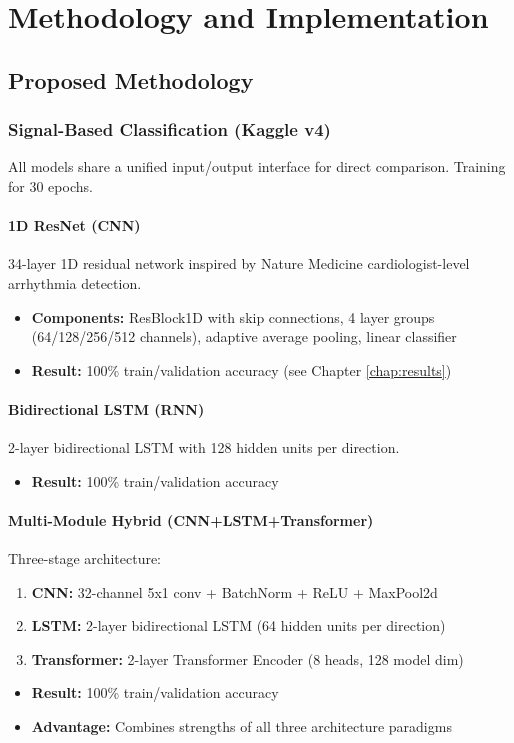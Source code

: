 \part{Methodology and Implementation}

\chapter{Proposed Methodology}
\label{chap:methodology}

\section{Signal-Based Classification (Kaggle v4)}
All models share a unified input/output interface for direct comparison. Training for 30 epochs.

\subsection{1D ResNet (CNN)}
34-layer 1D residual network inspired by Nature Medicine cardiologist-level arrhythmia detection.
\begin{itemize}
    \item \textbf{Components:} ResBlock1D with skip connections, 4 layer groups (64/128/256/512 channels), adaptive average pooling, linear classifier
    \item \textbf{Result:} 100\% train/validation accuracy (see Chapter \ref{chap:results})
\end{itemize}

\subsection{Bidirectional LSTM (RNN)}
2-layer bidirectional LSTM with 128 hidden units per direction.
\begin{itemize}
    \item \textbf{Result:} 100\% train/validation accuracy
\end{itemize}

\subsection{Multi-Module Hybrid (CNN+LSTM+Transformer)}
Three-stage architecture:
\begin{enumerate}
    \item \textbf{CNN:} 32-channel 5x1 conv + BatchNorm + ReLU + MaxPool2d
    \item \textbf{LSTM:} 2-layer bidirectional LSTM (64 hidden units per direction)
    \item \textbf{Transformer:} 2-layer Transformer Encoder (8 heads, 128 model dim)
\end{enumerate}
\begin{itemize}
    \item \textbf{Result:} 100\% train/validation accuracy
    \item \textbf{Advantage:} Combines strengths of all three architecture paradigms
\end{itemize}

